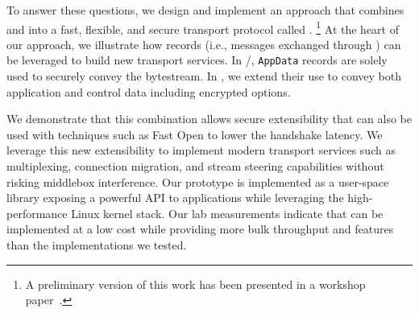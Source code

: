 To answer these questions, we design and implement an approach that combines
\tcp and  into a fast, flexible, and secure transport protocol called \textbf{\tcpls}.
%
\footnote{A preliminary version of this work has been presented in a workshop
  paper~\cite{rochet2020tcpls}.}  At the heart of our approach, we illustrate
how \tls records (i.e., messages exchanged through \tls) can be leveraged to
build new transport services. In \tcp/\tls, \tls \texttt{AppData} records are
solely used to securely convey the \tcp bytestream. In \tcpls, we extend their
use to convey both application and control data including encrypted \tcp
options.

We demonstrate that this combination allows secure extensibility that can also
be used with techniques such as \tcp Fast Open \cite{rfc7413} to lower the
handshake latency. We leverage this new extensibility to implement modern transport services such as multiplexing, connection migration, and stream steering capabilities without risking middlebox interference. Our \tcpls prototype is implemented as a user-space library exposing a powerful API to applications %
while leveraging the high-performance Linux kernel \tcp stack. Our lab measurements indicate that \tcpls can be implemented at a low cost while providing more bulk throughput and features than the \quic implementations we tested.


